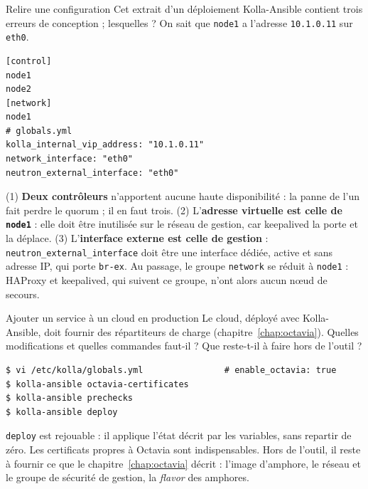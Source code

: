 \begin{exercice}{Relire une configuration}\label{ex:dep-relire}
Cet extrait d'un déploiement Kolla-Ansible contient trois erreurs de conception ; lesquelles ? On sait que \texttt{node1} a l'adresse
\texttt{10.1.0.11} sur \texttt{eth0}.

\begin{lstlisting}
[control]
node1
node2
[network]
node1
# globals.yml
kolla_internal_vip_address: "10.1.0.11"
network_interface: "eth0"
neutron_external_interface: "eth0"
\end{lstlisting}
\end{exercice}
\begin{correction}
(1) \textbf{Deux contrôleurs} n'apportent aucune haute disponibilité : la panne de l'un fait perdre le quorum ; il en faut trois.
(2) L'\textbf{adresse virtuelle est celle de \texttt{node1}} : elle doit être inutilisée sur le réseau de gestion, car keepalived la
porte et la déplace. (3) L'\textbf{interface externe est celle de gestion} : \texttt{neutron\_external\_interface} doit être une
interface dédiée, active et sans adresse IP, qui porte \texttt{br-ex}. Au passage, le groupe \texttt{network} se réduit à
\texttt{node1} : HAProxy et keepalived, qui suivent ce groupe, n'ont alors aucun nœud de secours.
\end{correction}

\begin{exercice}{Ajouter un service à un cloud en production}\label{ex:dep-service}
Le cloud, déployé avec Kolla-Ansible, doit fournir des répartiteurs de charge (chapitre~\ref{chap:octavia}). Quelles modifications et
quelles commandes faut-il ? Que reste-t-il à faire hors de l'outil ?
\end{exercice}
\begin{correction}
\begin{lstlisting}[style=terminal]
$ vi /etc/kolla/globals.yml                # enable_octavia: true
$ kolla-ansible octavia-certificates
$ kolla-ansible prechecks
$ kolla-ansible deploy
\end{lstlisting}
\texttt{deploy} est rejouable : il applique l'état décrit par les variables, sans repartir de zéro. Les certificats propres à
Octavia sont indispensables. Hors de l'outil, il reste à fournir ce que le chapitre~\ref{chap:octavia} décrit : l'image
d'amphore, le réseau et le groupe de sécurité de gestion, la \emph{flavor} des amphores.
\end{correction}

